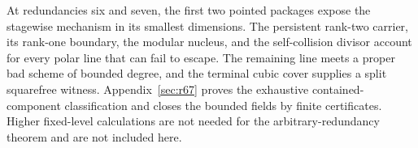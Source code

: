 At redundancies six and seven, the first two pointed packages expose the
stagewise mechanism in its smallest dimensions.  The persistent rank-two
carrier, its rank-one boundary, the modular nucleus, and the self-collision
divisor account for every polar line that can fail to escape.  The remaining
line meets a proper bad scheme of bounded degree, and the terminal cubic cover
supplies a split squarefree witness.  Appendix~\ref{sec:r67} proves the
exhaustive contained-component classification and closes the bounded fields
by finite certificates.  Higher fixed-level calculations are not needed for
the arbitrary-redundancy theorem and are not included here.
